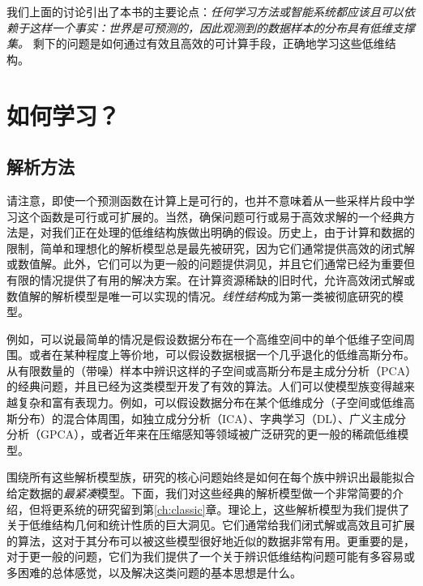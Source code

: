 \documentclass[../../book-main.tex]{subfiles}
\begin{document}
我们上面的讨论引出了本书的主要论点：{\em 任何学习方法或智能系统都应该且可以依赖于这样一个事实：世界是可预测的，因此观测到的数据样本的分布具有低维支撑集。} 剩下的问题是如何通过有效且高效的可计算手段，正确地学习这些低维结构。

\section{如何学习？}


\subsection{解析方法}
\label{sec:analytical}
请注意，即使一个预测函数在计算上是可行的，也并不意味着从一些采样片段中学习这个函数是可行或可扩展的。当然，确保问题可行或易于高效求解的一个经典方法是，对我们正在处理的低维结构族做出明确的假设。历史上，由于计算和数据的限制，简单和理想化的解析模型总是最先被研究，因为它们通常提供高效的闭式解或数值解。此外，它们可以为更一般的问题提供洞见，并且它们通常已经为重要但有限的情况提供了有用的解决方案。在计算资源稀缺的旧时代，允许高效闭式解或数值解的解析模型是唯一可以实现的情况。{\em 线性结构}成为第一类被彻底研究的模型。

例如，可以说最简单的情况是假设数据分布在一个高维空间中的单个低维子空间周围。或者在某种程度上等价地，可以假设数据根据一个几乎退化的低维高斯分布。从有限数量的（带噪）样本中辨识这样的子空间或高斯分布是主成分分析（PCA）的经典问题，并且已经为这类模型开发了有效的算法\cite{JolliffeI2002}。人们可以使模型族变得越来越复杂和富有表现力。例如，可以假设数据分布在某个低维成分（子空间或低维高斯分布）的混合体周围，如独立成分分析（ICA）\cite{Ans-1985}、字典学习（DL）、广义主成分分析（GPCA）\cite{Vidal-GPCA}，或者近年来在压缩感知等领域被广泛研究的更一般的稀疏低维模型\cite{Wright-Ma-2022}。

围绕所有这些解析模型族，研究的核心问题始终是如何在每个族中辨识出最能拟合给定数据的{\em 最紧凑}模型。下面，我们对这些经典的解析模型做一个非常简要的介绍，但将更系统的研究留到第\ref{ch:classic}章。理论上，这些解析模型为我们提供了关于低维结构几何和统计性质的巨大洞见。它们通常给我们闭式解或高效且可扩展的算法，这对于其分布可以被这些模型很好地近似的数据非常有用。更重要的是，对于更一般的问题，它们为我们提供了一个关于辨识低维结构问题可能有多容易或多困难的总体感觉，以及解决这类问题的基本思想是什么。
\end{document}
